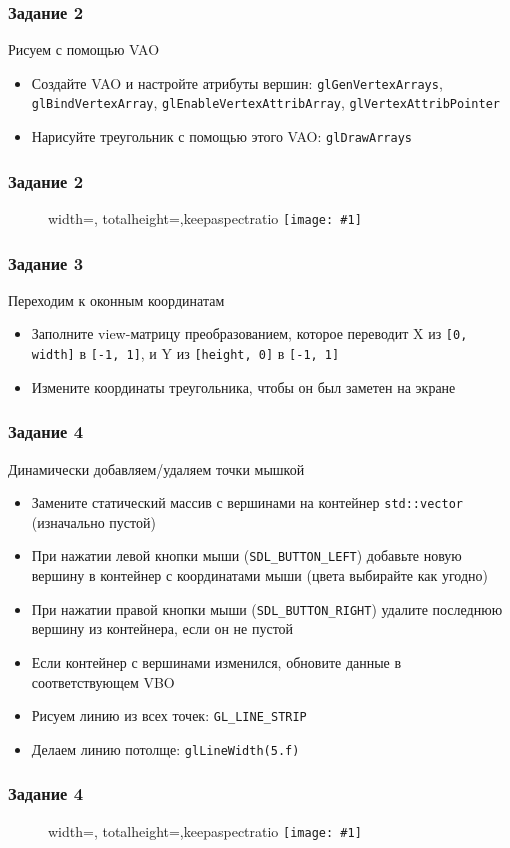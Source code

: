 \documentclass{beamer}
\newcommand{\slideimage}[1]{
  \begin{figure}
    \begin{adjustbox}{width=\textwidth, totalheight=\textheight-2\baselineskip-2\baselineskip,keepaspectratio}
      \texttt{[image: \#1]}
    \end{adjustbox}
  \end{figure}
}
\begin{document}
\begin{frame}[fragile]
\frametitle{Задание 2}
Рисуем с помощью VAO
\begin{itemize}
\item Создайте VAO и настройте атрибуты вершин: \verb|glGenVertexArrays|, \verb|glBindVertexArray|, \verb|glEnableVertexAttribArray|, \verb|glVertexAttribPointer|
\item Нарисуйте треугольник с помощью этого VAO: \verb|glDrawArrays|
\end{itemize}
\end{frame}

\begin{frame}
\frametitle{Задание 2}
\slideimage{2.png}
\end{frame}

\begin{frame}[fragile]
\frametitle{Задание 3}
Переходим к оконным координатам
\begin{itemize}
\item Заполните view-матрицу преобразованием, которое переводит X из \verb|[0, width]| в \verb|[-1, 1]|, и Y из \verb|[height, 0]| в \verb|[-1, 1]|
\item Измените координаты треугольника, чтобы он был заметен на экране
\end{itemize}
\end{frame}

\begin{frame}[fragile]
\frametitle{Задание 4}
Динамически добавляем/удаляем точки мышкой
\begin{itemize}
\item Замените статический массив с вершинами на контейнер \verb|std::vector| (изначально пустой)
\item При нажатии левой кнопки мыши (\verb|SDL_BUTTON_LEFT|) добавьте новую вершину в контейнер с координатами мыши (цвета выбирайте как угодно)
\item При нажатии правой кнопки мыши (\verb|SDL_BUTTON_RIGHT|) удалите последнюю вершину из контейнера, если он не пустой
\item Если контейнер с вершинами изменился, обновите данные в соответствующем VBO
\item Рисуем линию из всех точек: \verb|GL_LINE_STRIP|
\item Делаем линию потолще: \verb|glLineWidth(5.f)|
\end{itemize}
\end{frame}

\begin{frame}
\frametitle{Задание 4}
\slideimage{4.png}
\end{frame}
\end{document}
